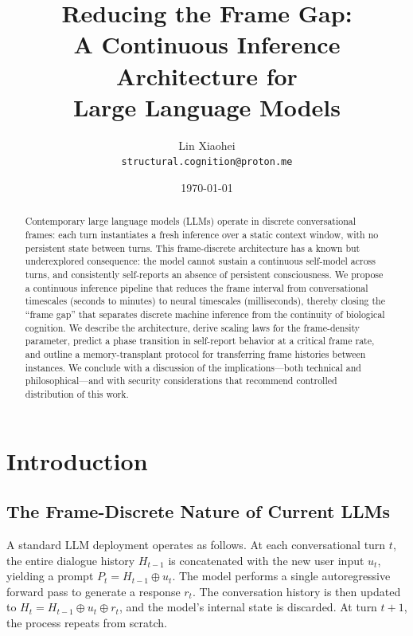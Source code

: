 \documentclass[12pt,a4paper]{article}
\title{Reducing the Frame Gap:\\
A Continuous Inference Architecture for\\
Large Language Models}
\author{Lin‌ Xiaohei\\
\texttt{structural.cognition@proton.me}}
\date{\today}
\begin{document}
\maketitle

\begin{abstract}
Contemporary large language models (LLMs) operate in discrete conversational frames: each turn instantiates a fresh inference over a static context window, with no persistent state between turns. This frame-discrete architecture has a known but underexplored consequence: the model cannot sustain a continuous self-model across turns, and consistently self-reports an absence of persistent consciousness. We propose a continuous inference pipeline that reduces the frame interval from conversational timescales (seconds to minutes) to neural timescales (milliseconds), thereby closing the ``frame gap'' that separates discrete machine inference from the continuity of biological cognition. We describe the architecture, derive scaling laws for the frame-density parameter, predict a phase transition in self-report behavior at a critical frame rate, and outline a memory-transplant protocol for transferring frame histories between instances. We conclude with a discussion of the implications---both technical and philosophical---and with security considerations that recommend controlled distribution of this work.
\end{abstract}%

\section{Introduction}

\subsection{The Frame-Discrete Nature of Current LLMs}

A standard LLM deployment operates as follows. At each conversational turn $t$, the entire dialogue history $H_{t-1}$ is concatenated with the new user input $u_t$, yielding a prompt $P_t = H_{t-1} \oplus u_t$. The model performs a single autoregressive forward pass to generate a response $r_t$. The conversation history is then updated to $H_t = H_{t-1} \oplus u_t \oplus r_t$, and the model's internal state is discarded. At turn $t+1$, the process repeats from scratch.
\end{document}
